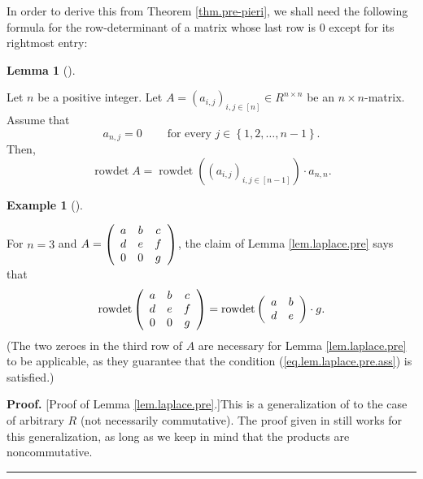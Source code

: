 \documentclass
[numbers=enddot,12pt,final,onecolumn,notitlepage,english]{scrartcl}%
\theoremstyle{definition}
\newtheorem{lem}[theo]{Lemma}
\newenvironment{lemma}[1][]
{\begin{lem}[#1]\begin{leftbar}}
{\end{leftbar}\end{lem}}
\newtheorem{exam}[theo]{Example}
\newenvironment{example}[1][]
{\begin{exam}[#1]\begin{leftbar}}
{\end{leftbar}\end{exam}}
\newenvironment{proof}[1][Proof]{\noindent\textbf{#1.} }{\ \rule{0.5em}{0.5em}}
\newenvironment{vershort}{}{}
\begin{document}
In order to derive this from Theorem \ref{thm.pre-pieri}, we shall need the
following formula for the row-determinant of a matrix whose last row is $0$
except for its rightmost entry:

\begin{lemma}
\label{lem.laplace.pre}Let $n$ be a positive integer. Let $A=\left(
a_{i,j}\right)  _{i,j\in\left[  n\right]  }\in R^{n\times n}$ be an $n\times
n$-matrix. Assume that%
\begin{equation}
a_{n,j}=0\ \ \ \ \ \ \ \ \ \ \text{for every }j\in\left\{  1,2,\ldots
,n-1\right\}  . \label{eq.lem.laplace.pre.ass}%
\end{equation}
Then,
\[
\operatorname*{rowdet}A=\operatorname*{rowdet}\left(  \left(  a_{i,j}\right)
_{i,j\in\left[  n-1\right]  }\right)  \cdot a_{n,n}.
\]

\end{lemma}

\begin{example}
For $n=3$ and $A=\left(
\begin{array}
[c]{ccc}%
a & b & c\\
d & e & f\\
0 & 0 & g
\end{array}
\right)  $, the claim of Lemma \ref{lem.laplace.pre} says that%
\[
\operatorname*{rowdet}\left(
\begin{array}
[c]{ccc}%
a & b & c\\
d & e & f\\
0 & 0 & g
\end{array}
\right)  =\operatorname*{rowdet}\left(
\begin{array}
[c]{cc}%
a & b\\
d & e
\end{array}
\right)  \cdot g.
\]
(The two zeroes in the third row of $A$ are necessary for Lemma
\ref{lem.laplace.pre} to be applicable, as they guarantee that the condition
(\ref{eq.lem.laplace.pre.ass}) is satisfied.)
\end{example}

\begin{vershort}
\begin{proof}
[Proof of Lemma \ref{lem.laplace.pre}.]This is a generalization of
\cite[Theorem 6.43]{detnotes} to the case of arbitrary $R$ (not necessarily
commutative). The proof given in \cite{detnotes} still works for this
generalization, as long as we keep in mind that the products are noncommutative.
\end{proof}
\end{vershort}
\end{document}
